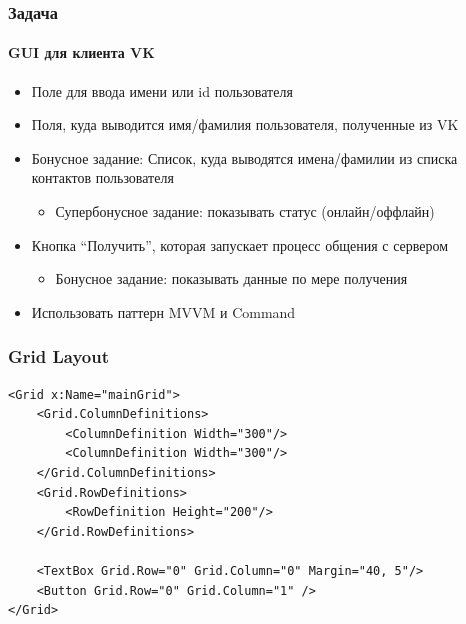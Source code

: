 \documentclass[xetex,mathserif,serif]{beamer}
\begin{document}
	\begin{frame}
		\frametitle{Задача}
		\framesubtitle{GUI для клиента VK}
		\begin{itemize}
			\item Поле для ввода имени или id пользователя
			\item Поля, куда выводится имя/фамилия пользователя, полученные из VK
			\item Бонусное задание: Список, куда выводятся имена/фамилии из списка контактов пользователя
			\begin{itemize}
				\item Супербонусное задание: показывать статус (онлайн/оффлайн)
			\end{itemize}
			\item Кнопка ``Получить'', которая запускает процесс общения с сервером
			\begin{itemize}
				\item Бонусное задание: показывать данные по мере получения
			\end{itemize}
			\item Использовать паттерн MVVM и Command
		\end{itemize}
	\end{frame}

	\begin{frame}[fragile]
		\frametitle{Grid Layout}
		\begin{verbatim}
<Grid x:Name="mainGrid">
    <Grid.ColumnDefinitions>
        <ColumnDefinition Width="300"/>
        <ColumnDefinition Width="300"/>
    </Grid.ColumnDefinitions>
    <Grid.RowDefinitions>
        <RowDefinition Height="200"/>
    </Grid.RowDefinitions>

    <TextBox Grid.Row="0" Grid.Column="0" Margin="40, 5"/>
    <Button Grid.Row="0" Grid.Column="1" />
</Grid>
		\end{verbatim}
	\end{frame}
\end{document}
